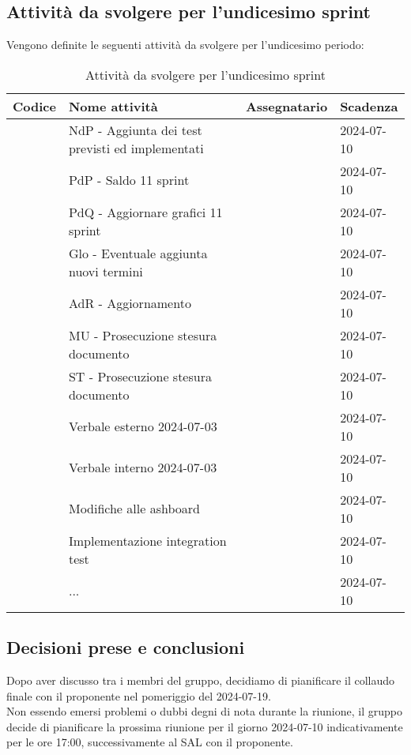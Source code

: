 \documentclass[italian,12pt]{article}
\begin{document}
\newpage
\subsection{Attività da svolgere per l'undicesimo sprint}
Vengono definite le seguenti attività da svolgere per l'undicesimo periodo:
\begin{table}[!h]
	\centering
	\begin{tabular}{ |l||p{7cm}|l|l| }
		\hline
		\textbf{Codice}          & \textbf{Nome attività}                           & \textbf{Assegnatario} & \textbf{Scadenza} \\
		\hline
		\mySkip[]       & NdP - Aggiunta dei test previsti ed implementati &  & 2024-07-10        \\
		\mySkip[]       & PdP - Saldo 11 sprint                            &  & 2024-07-10        \\
		\mySkip[]       & PdQ - Aggiornare grafici 11 sprint               &  & 2024-07-10        \\
		\mySkip[]       & Glo - Eventuale aggiunta nuovi termini           &  & 2024-07-10        \\
		\mySkip[]       & AdR - Aggiornamento                              &  & 2024-07-10        \\
		\mySkip[]       & MU - Prosecuzione stesura documento              &  & 2024-07-10        \\
		\mySkip[]       & ST - Prosecuzione stesura documento              &  & 2024-07-10        \\
		\mySkip[]       & Verbale esterno 2024-07-03                       &  & 2024-07-10        \\
		\mySkip[]       & Verbale interno 2024-07-03                       &  & 2024-07-10        \\
		\mySkip[]       & Modifiche alle ashboard                          &  & 2024-07-10        \\
		\mySkip[]       & Implementazione integration test                 &  & 2024-07-10        \\
		\mySkip[]       & ...                                              &  & 2024-07-10        \\
		\hline
	\end{tabular}
	\caption{Attività da svolgere per l'undicesimo sprint}
\end{table}

\subsection{Decisioni prese e conclusioni}
Dopo aver discusso tra i membri del gruppo, decidiamo di pianificare il collaudo finale con il proponente nel pomeriggio del 2024-07-19. \\
Non essendo emersi problemi o dubbi degni di nota durante la riunione, il gruppo decide di pianificare la prossima riunione per il giorno 2024-07-10 indicativamente per le ore 17:00, successivamente al SAL con il proponente.
\end{document}

